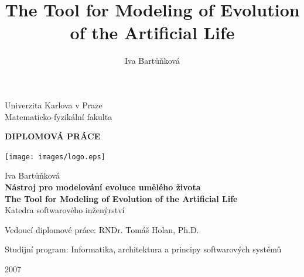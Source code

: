 \documentclass[a4paper,12pt]{report}
\title{The Tool for Modeling of Evolution of the Artificial Life}
\author{Iva Bartů\v{n}kov\'{a}}
\begin{document}
\begin{titlepage}
\begin{center}
\vspace{15mm}
\large
Univerzita Karlova v Praze\\
Matematicko-fyzikální fakulta\\

\vspace{5mm}

{\Large\bf DIPLOMOV\'{A} PR\'{A}CE}

\vspace{10mm}


\begin{center}
  \texttt{[image: images/logo.eps]}
\end{center}


\vspace{15mm}

{\Large Iva Bartů\v{n}kov\'{a}}\\
\vspace{5mm}
{\Large\bf N\'{a}stroj pro modelov\'{a}n\'{i} evoluce um\v{e}l\'{e}ho \v{z}ivota} \\
{\Large\bf The Tool for Modeling of Evolution of the Artificial Life} \\
\vspace{5mm}
Katedra softwarov\'{e}ho in\v{z}en\'{y}rstv\'{i}



\vspace{15mm}
\large
\noindent Vedoucí diplomové práce: RNDr. Tom\'{a}\v{s} Holan, Ph.D.
\vspace{1mm} 

\noindent Studijní program: Informatika, architektura a principy softwarov\'{y}ch syst\'{e}mů %

\vspace{20mm}

2007
\end{center}

\end{titlepage}
\normalsize %
\setcounter{page}{2} %
\ \vspace{10mm} 

\noindent 
\end{document}
